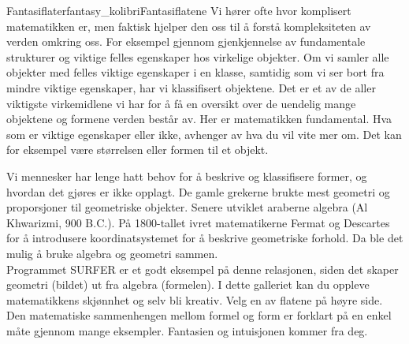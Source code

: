 \begin{surferIntroPage}{Fantasiflater}{fantasy_kolibri}{Fantasiflatene}
Vi hører ofte hvor komplisert matematikken er, men faktisk hjelper den oss til å forstå kompleksiteten av verden omkring oss. For eksempel gjennom gjenkjennelse av fundamentale strukturer og viktige felles egenskaper hos virkelige objekter. Om vi samler alle objekter med felles viktige egenskaper i en klasse, samtidig som vi ser bort fra mindre viktige egenskaper, har vi klassifisert objektene. Det er et av de aller viktigste virkemidlene vi har for å få en oversikt over de uendelig mange objektene og formene verden består av. Her er matematikken fundamental. Hva som er viktige egenskaper eller ikke, avhenger av hva du vil vite mer om.  Det kan for eksempel være størrelsen eller formen til et objekt.  
\\

\vspace{0.4cm}

Vi mennesker har lenge hatt behov for å beskrive og klassifisere former, og hvordan det gjøres er ikke opplagt. De gamle grekerne brukte mest geometri og proporsjoner til geometriske objekter. Senere utviklet araberne algebra (Al Khwarizmi, 900 B.C.). På 1800-tallet ivret matematikerne Fermat og Descartes for å introdusere koordinatsystemet for å beskrive geometriske forhold. Da ble det mulig å bruke algebra og geometri sammen.  
\\
\vspace{0.4cm}
Programmet SURFER er et godt eksempel på denne relasjonen, siden det skaper geometri (bildet) ut fra algebra (formelen). I dette galleriet kan du oppleve matematikkens skjønnhet og selv bli kreativ. Velg en av flatene på høyre side. Den matematiske sammenhengen mellom formel og form er forklart på en enkel måte gjennom mange eksempler. Fantasien og intuisjonen kommer fra deg.
\end{surferIntroPage}

